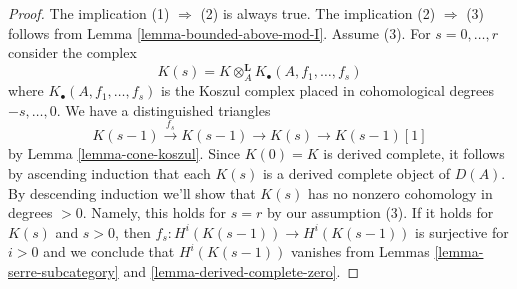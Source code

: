 \documentclass[10pt,a4paper]{amsart}
\theoremstyle{plain}
\theoremstyle{definition}
\theoremstyle{remark}
\numberwithin{equation}{subsection}
\begin{document}
\begin{proof}
The implication (1) $\Rightarrow$ (2) is always true. The implication
(2) $\Rightarrow$ (3) follows from Lemma \ref{lemma-bounded-above-mod-I}.
Assume (3). For $s = 0, \ldots, r$ consider the complex
$$
K(s) =  K \otimes_A^\mathbf{L} K_\bullet(A, f_1, \ldots, f_s)
$$
where $K_\bullet(A, f_1, \ldots, f_s)$ is the Koszul complex
placed in cohomological degrees $-s, \ldots, 0$.
We have a distinguished triangles
$$
K(s - 1) \xrightarrow{f_s} K(s - 1) \to K(s) \to K(s - 1)[1]
$$
by Lemma \ref{lemma-cone-koszul}. Since $K(0) = K$ is derived complete,
it follows by ascending induction that each $K(s)$ is a derived complete
object of $D(A)$. By descending induction we'll show that $K(s)$
has no nonzero cohomology in degrees $> 0$. Namely, this holds for $s = r$
by our assumption (3). If it holds for $K(s)$ and $s > 0$, then
$f_s : H^i(K(s - 1)) \to H^i(K(s - 1))$ is surjective for
$i > 0$ and we conclude that $H^i(K(s - 1))$ vanishes from
Lemmas \ref{lemma-serre-subcategory} and \ref{lemma-derived-complete-zero}.
\end{proof}
\end{document}
